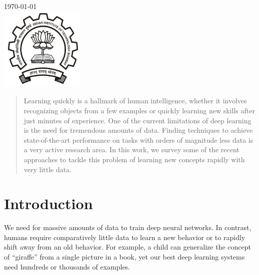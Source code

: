 \begin{titlepage}

{\large \today}\\[2cm] %


\includegraphics[height=4cm]{logo.jpg}\\[1cm] %
 

\vfill %

\end{titlepage}


\tableofcontents
\pagebreak

\begin{abstract}
Learning quickly is a hallmark of human intelligence, whether it involves recognizing objects from a few examples or quickly learning new skills after just minutes of experience. One of the current limitations of deep learning is the need for tremendous amounts of data.
Finding techniques to achieve state-of-the-art performance on tasks with orders of magnitude less data is a very active research area. In this work, we survey some of the recent approaches to tackle this problem of learning new concepts rapidly with very little data.
\end{abstract}

\section{Introduction}

We need for massive amounts of data to train deep neural networks. In contrast, humans require comparatively little data to learn a new behavior or to rapidly shift away from an old behavior. For example,  a child can generalize the concept of “giraffe” from a single picture in a book, yet our best deep learning systems need hundreds or thousands of examples.\\

